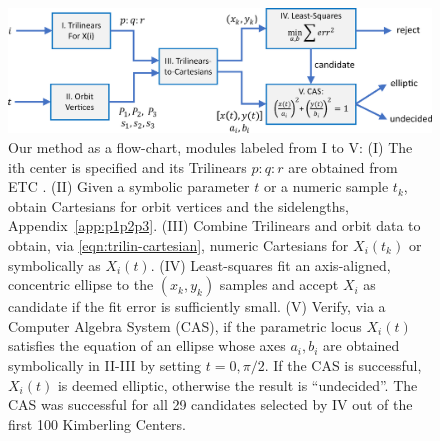 \begin{figure}
    \centering
    \includegraphics[width=.9\textwidth]{pics_1130_algo_proof_elliptic.eps}
    \caption{Our method as a flow-chart, modules labeled from I to V: (I) The ith center is specified and its Trilinears $p:q:r$ are obtained from ETC \cite{etc}. (II) Given a symbolic parameter $t$ or a numeric sample $t_k$, obtain Cartesians for orbit vertices and the sidelengths, Appendix~\ref{app:p1p2p3}. (III) Combine Trilinears and orbit data to obtain, via \eqref{eqn:trilin-cartesian}, numeric Cartesians for $X_i(t_k)$ or symbolically as $X_i(t)$. (IV) Least-squares fit an axis-aligned, concentric ellipse to the $(x_k,y_k)$ samples and accept $X_i$ as candidate if the fit error is sufficiently small. (V) Verify, via a Computer Algebra System (CAS), if the parametric locus $X_i(t)$ satisfies the equation of an ellipse whose axes $a_i,b_i$ are obtained symbolically in II-III by setting $t=0,\pi/2$. If the CAS is successful, $X_i(t)$ is deemed elliptic, otherwise the result is ``undecided''. The CAS was successful for all 29 candidates selected by IV out of the first 100 Kimberling Centers.}
    \label{fig:method-pipeline}
\end{figure}





